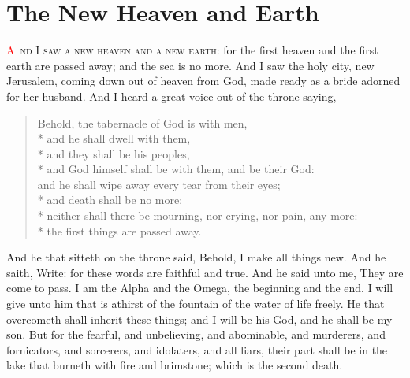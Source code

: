 
\chapter{The New Heaven and Earth}
\lettrine[lines=3,slope=0.5em]{\textcolor{red}{A}}{\ nd I saw a new heaven and a new earth}: for the first heaven and the first earth are passed away; and the sea is no more. 
 And I saw the holy city, new Jerusalem, coming down out of heaven from God, made ready as a bride adorned for her husband. 
 And I heard a great voice out of the throne saying,
\begin{verse}
Behold, the tabernacle of God is with men,\\*\vin
and he shall dwell with them,\\*\vin
and they shall be his peoples,\\*\vin
and God himself shall be with them, and be their God:\\
and he shall wipe away every tear from their eyes;\\*\vin
and death shall be no more;\\*\vin
neither shall there be mourning, nor crying, nor pain, any more:\\*\vin
the first things are passed away.
\end{verse}

 And he that sitteth on the throne said, Behold, I make all things new. And he saith, Write: for these words are faithful and true. 
 And he said unto me, They are come to pass. I am the Alpha and the Omega, the beginning and the end. I will give unto him that is athirst of the fountain of the water of life freely. 
 He that overcometh shall inherit these things; and I will be his God, and he shall be my son. 
 But for the fearful, and unbelieving, and abominable, and murderers, and fornicators, and sorcerers, and idolaters, and all liars, their part shall be in the lake that burneth with fire and brimstone; which is the second death.


